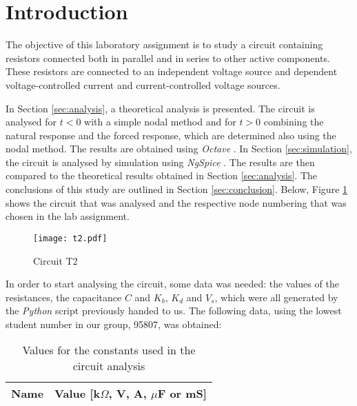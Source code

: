 \section{Introduction}
\label{sec:introduction}

The objective of this laboratory assignment is to study a circuit containing resistors connected both in parallel and in series to other active components. These resistors are connected to an independent voltage source and dependent voltage-controlled current and current-controlled voltage sources.


In Section \ref{sec:analysis}, a theoretical analysis is presented. The circuit is analysed for $t<0$ with a simple nodal method and for $t>0$ combining the natural response and the forced response, which are determined also using the nodal method. The results are obtained using \emph{Octave} \cite{bib:octave}. In Section \ref{sec:simulation}, the circuit is analysed by simulation using \emph{NgSpice} \cite{bib:ngspice}. The results are then compared to the theoretical results obtained in Section \ref{sec:analysis}. The conclusions of this study are outlined in Section \ref{sec:conclusion}. Below, Figure \ref{fig:t2circuit} shows the circuit that was analysed and the respective node numbering that was chosen in the lab assignment.

\begin{figure}[!htp] \centering
\texttt{[image: t2.pdf]}
\caption{Circuit T2}
\label{fig:t2circuit}
\end{figure}
\FloatBarrier

In order to start analysing the circuit, some data was needed: the values of the resistances, the capacitance $C$ and $K_b$, $K_d$ and $V_s$, which were all generated by the \emph{Python} script previously handed to us. The following data, using the lowest student number in our group, 95807, was obtained:

\begin{table}[h]                             

\centering                                  %
                        
\def\arraystretch{1.2}                       %
\begin{tabular}{c|c}                    %
\hline                                  %

\textbf{Name}  & \textbf{Value [k$\Omega$, V, A, $\mu$F or mS]}\\     

\hline                                %

\hline                                %
\end{tabular}   

\caption{Values for the constants used in the circuit analysis}
\label{tab1}   
\end{table}                             
\FloatBarrier
